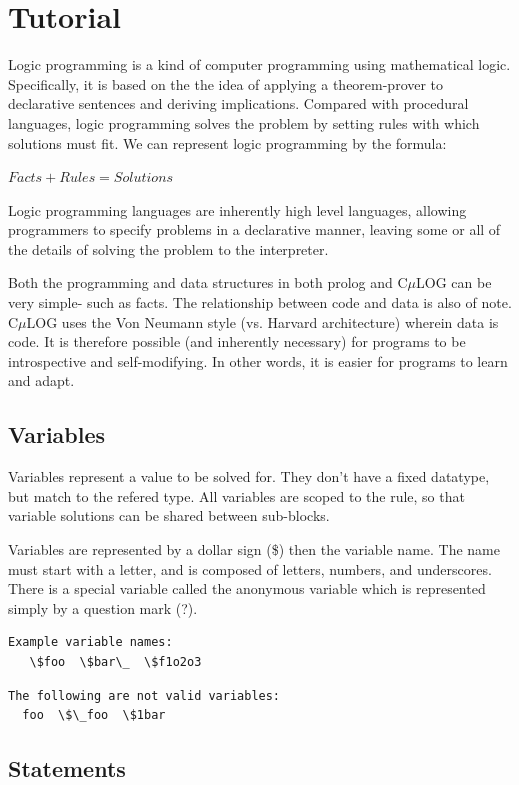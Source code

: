 \documentclass[onecolumn,titlepage]{article}
\begin{document}
\section{Tutorial}

Logic programming is a kind of computer programming using mathematical
logic. Specifically, it is based on the the idea of applying a
theorem-prover to declarative sentences and deriving
implications. Compared with procedural languages, logic programming
solves the problem by setting rules with which solutions must fit. We
can represent logic programming by the formula:

$Facts + Rules = Solutions$

Logic programming languages are inherently high level
languages, allowing programmers to specify problems in a declarative
manner, leaving some or all of the details of solving the problem to
the interpreter. 

Both the programming and data
structures in both prolog and C$\mu$LOG can be very simple- such as
facts. The relationship between code and data is also of note. C$\mu$LOG
uses the Von Neumann style (vs. Harvard architecture) wherein data is
code. It is therefore possible (and inherently necessary) for programs
to be introspective and self-modifying. In other words, it is easier
for programs to learn and adapt.


\subsection{Variables}
Variables represent a value to be solved for. They don't have a fixed
datatype, but match to the refered type. All variables are scoped to
the rule, so that variable solutions can be shared between sub-blocks.

Variables are represented by a dollar sign (\$) then the variable
name. The name must start with a letter, and is composed of letters,
numbers, and underscores. There is a special variable called the
anonymous variable which is represented simply by a question mark (?).


\begin{verbatim}
Example variable names:
   \$foo  \$bar\_  \$f1o2o3
\end{verbatim}

\begin{verbatim}
The following are not valid variables:
  foo  \$\_foo  \$1bar
\end{verbatim}

\subsection{Statements}
\end{document}
